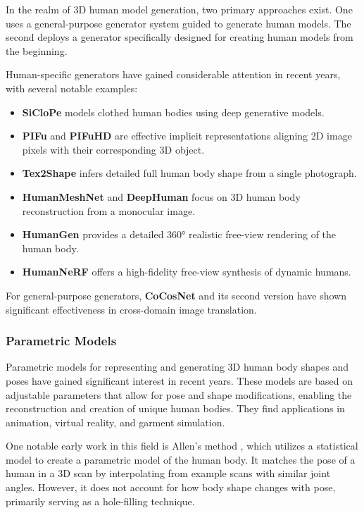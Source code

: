 In the realm of 3D human model generation, two primary approaches exist. One
uses a general-purpose generator system guided to generate human models. The
second deploys a generator specifically designed for creating human models from
the beginning.

Human-specific generators have gained considerable attention in recent years,
with several notable examples:

\begin{itemize}
	\item \textbf{SiCloPe} \citep{DBLP:journals/corr/abs-1901-00049} models clothed human bodies using deep generative models.
	\item \textbf{PIFu} and \textbf{PIFuHD} \citep{pifu, pifuhd} are effective implicit representations aligning 2D image pixels with their corresponding 3D object.
	\item \textbf{Tex2Shape} \citep{alldieck2019tex2shape} infers detailed full human body shape from a single photograph.
	\item \textbf{HumanMeshNet} \citep{DBLP:journals/corr/abs-1908-06544} and \textbf{DeepHuman} \citep{DBLP:journals/corr/abs-1903-06473} focus on 3D human body reconstruction from a monocular image.
	\item \textbf{HumanGen} \citep{jiang2022humangen} provides a detailed 360° realistic free-view rendering of the human body.
	\item \textbf{HumanNeRF} \citep{weng_humannerf_2022_cvpr} offers a high-fidelity free-view synthesis of dynamic humans.
\end{itemize}

For general-purpose generators, \textbf{CoCosNet} and its second version
\citep{CoCosNet, CoCosNet2} have shown significant effectiveness in
cross-domain image translation.

\subsubsection{Parametric Models}

Parametric models for representing and generating 3D human body shapes and
poses have gained significant interest in recent years. These models are based
on adjustable parameters that allow for pose and shape modifications, enabling
the reconstruction and creation of unique human bodies. They find applications
in animation, virtual reality, and garment simulation.

One notable early work in this field is Allen's method \citep{allen:2003},
which utilizes a statistical model to create a parametric model of the human
body. It matches the pose of a human in a 3D scan by interpolating from example
scans with similar joint angles. However, it does not account for how body
shape changes with pose, primarily serving as a hole-filling technique.

